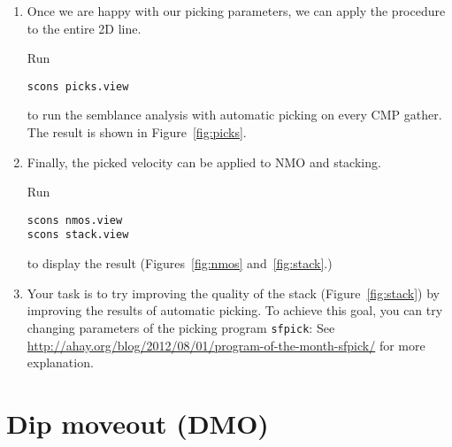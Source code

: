 \begin{enumerate}

\item Once we are happy with our picking parameters, we can apply the procedure to the entire 2D line. 

Run
\begin{verbatim}
scons picks.view
\end{verbatim}
to run the semblance analysis with automatic picking on every CMP
gather. The result is shown in Figure~\ref{fig:picks}.


\item Finally, the picked velocity can be applied to NMO and stacking.         

Run
\begin{verbatim}
scons nmos.view
scons stack.view
\end{verbatim}
to display the result (Figures~\ref{fig:nmos} and~\ref{fig:stack}.) 



\item Your task is to try improving the quality of the stack (Figure~\ref{fig:stack}) by improving 
the results of automatic picking. To achieve this goal, you can try changing parameters of the picking 
program \texttt{sfpick}: See \url{http://ahay.org/blog/2012/08/01/program-of-the-month-sfpick/} for more 
explanation.

\end{enumerate}

\section{Dip moveout (DMO)}

